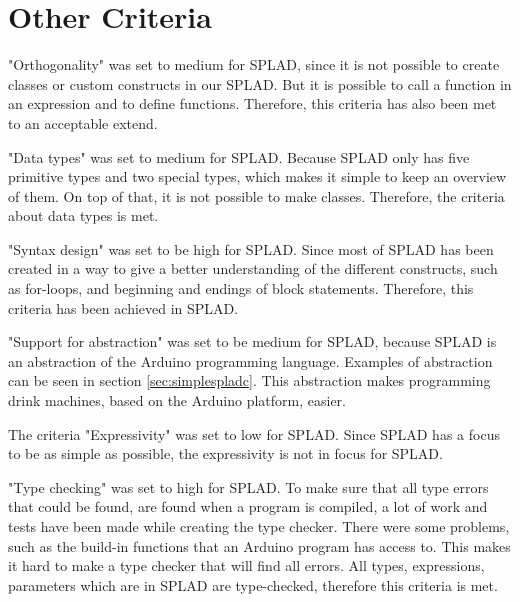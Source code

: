 \section{Other Criteria}

"Orthogonality" was set to medium for SPLAD, since it is not possible to create classes or custom constructs in our SPLAD. But it is possible to call a function in an expression and to define functions. Therefore, this criteria has also been met to an acceptable extend.

"Data types" was set to medium for SPLAD. Because SPLAD only has five primitive types and two special types, which makes it simple to keep an overview of them. On top of that, it is not possible to make classes. Therefore, the criteria about data types is met.

"Syntax design" was set to be high for SPLAD. Since most of SPLAD has been created in a way to give a better understanding of the different constructs, such as for-loops, and beginning and endings of block statements. Therefore, this criteria has been achieved in SPLAD.

"Support for abstraction" was set to be medium for SPLAD, because SPLAD is an abstraction of the Arduino programming language. Examples of abstraction can be seen in section \ref{sec:simplespladc}. This abstraction makes programming drink machines, based on the Arduino platform, easier.

The criteria "Expressivity" was set to low for SPLAD. Since SPLAD has a focus to be as simple as possible, the expressivity is not in focus for SPLAD. 

"Type checking" was set to high for SPLAD. To make sure that all type errors that could be found, are found when a program is compiled, a lot of work and tests have been made while creating the type checker. There were some problems, such as the build-in functions that an Arduino program has access to. This makes it hard to make a type checker that will find all errors. All types, expressions, parameters which are in SPLAD are type-checked, therefore this criteria is met. 